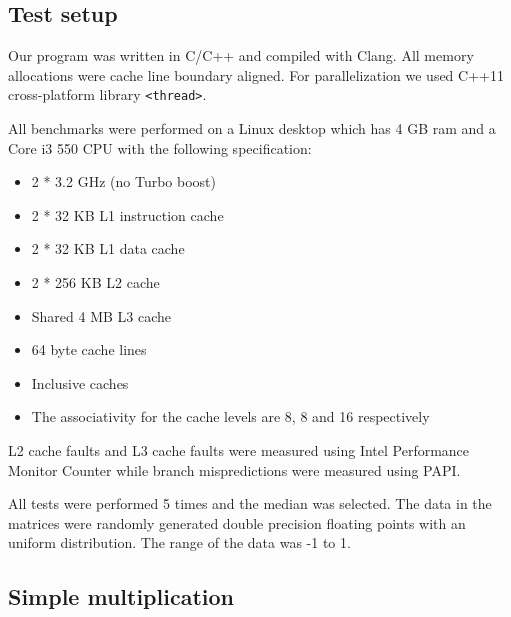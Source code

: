 \subsection{Test setup}

Our program was written in C/C++ and compiled with Clang. All memory allocations were cache line boundary aligned. For parallelization we used C++11 cross-platform library \texttt{<thread>}.

All benchmarks were performed on a Linux desktop which has 4 GB ram and a Core i3 550 CPU with the following specification:

\begin{itemize}
\item 2 * 3.2 GHz (no Turbo boost)
\item 2 * 32 KB L1 instruction cache
\item 2 * 32 KB L1 data cache
\item 2 * 256 KB L2 cache
\item Shared 4 MB L3 cache
\item 64 byte cache lines
\item Inclusive caches
\item The associativity for the cache levels are 8, 8 and 16 respectively
\end{itemize}

L2 cache faults and L3 cache faults were measured using Intel Performance Monitor Counter while branch mispredictions were measured using PAPI.

All tests were performed 5 times and the median was selected. The data in the matrices were randomly generated double precision floating points with
an uniform distribution. The range of the data was -1 to
1.

\subsection{Simple multiplication}

